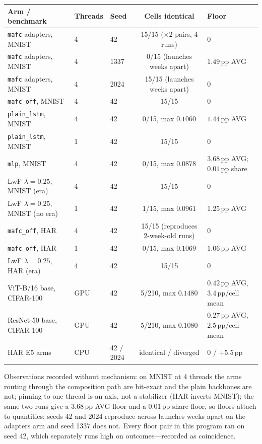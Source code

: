 \begin{center}\small
\begin{tabular}{@{}lllcl@{}}
\toprule
Arm / benchmark & Threads & Seed & Cells identical & Floor \\
\midrule
\texttt{mafc} adapters, MNIST       & 4 & 42   & 15/15 ($\times 2$ pairs, 4 runs) & $0$ \\
\texttt{mafc} adapters, MNIST       & 4 & 1337 & 0/15 (launches weeks apart)     & $1.49$\,pp AVG \\
\texttt{mafc} adapters, MNIST       & 4 & 2024 & 15/15 (launches weeks apart)    & $0$ \\
\texttt{mafc\_off}, MNIST           & 4 & 42   & 15/15                           & $0$ \\
\texttt{plain\_lstm}, MNIST         & 4 & 42   & 0/15, max $0.1060$              & $1.44$\,pp AVG \\
\texttt{plain\_lstm}, MNIST         & 1 & 42   & 15/15                           & $0$ \\
\texttt{mlp}, MNIST                 & 4 & 42   & 0/15, max $0.0878$              & $3.68$\,pp AVG; $\mathbf{0.01}$\,pp share \\
LwF $\lambda{=}0.25$, MNIST (era)   & 4 & 42   & 15/15                           & $0$ \\
LwF $\lambda{=}0.25$, MNIST (no era)& 1 & 42   & 1/15, max $0.0961$              & $1.25$\,pp AVG \\
\texttt{mafc\_off}, HAR             & 4 & 42   & 15/15 (reproduces 2-week-old runs) & $0$ \\
\texttt{mafc\_off}, HAR             & 1 & 42   & 0/15, max $0.1069$              & $1.06$\,pp AVG \\
LwF $\lambda{=}0.25$, HAR (era)     & 4 & 42   & 15/15                           & $0$ \\
ViT-B/16 base, CIFAR-100            & GPU & 42 & 5/210, max $0.1480$             & $0.42$\,pp AVG, $3.4$\,pp/cell mean \\
ResNet-50 base, CIFAR-100           & GPU & 42 & 5/210, max $0.1080$             & $0.27$\,pp AVG, $2.5$\,pp/cell mean \\
HAR E5 arms                         & CPU & 42 / 2024 & identical / diverged     & $0$ / $+5.5$\,pp \\
\bottomrule
\end{tabular}
\end{center}

Observations recorded without mechanism: on MNIST at 4 threads the arms routing
through the composition path are bit-exact and the plain backbones are not;
pinning to one thread is an axis, not a stabilizer (HAR inverts MNIST); the
same two runs give a $3.68$\,pp AVG floor and a $0.01$\,pp share floor, so floors
attach to quantities; seeds 42 and 2024 reproduce across launches weeks apart on
the adapters arm and seed 1337 does not. Every floor pair in this program ran on
seed 42, which separately runs high on outcomes---recorded as coincidence.

